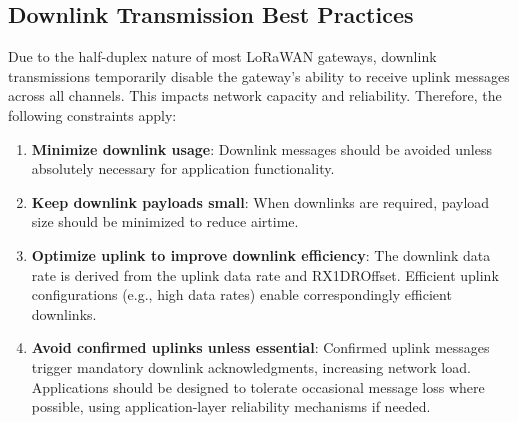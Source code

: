 \subsection{Downlink Transmission Best Practices}

Due to the half-duplex nature of most LoRaWAN gateways, downlink transmissions temporarily disable the gateway’s ability to receive uplink messages across all channels. This impacts network capacity and reliability. Therefore, the following constraints apply:

\begin{enumerate}
    \item \textbf{Minimize downlink usage}: Downlink messages should be avoided unless absolutely necessary for application functionality.
    \item \textbf{Keep downlink payloads small}: When downlinks are required, payload size should be minimized to reduce airtime.
    \item \textbf{Optimize uplink to improve downlink efficiency}: The downlink data rate is derived from the uplink data rate and RX1DROffset. Efficient uplink configurations (e.g., high data rates) enable correspondingly efficient downlinks.
    \item \textbf{Avoid confirmed uplinks unless essential}: Confirmed uplink messages trigger mandatory downlink acknowledgments, increasing network load. Applications should be designed to tolerate occasional message loss where possible, using application-layer reliability mechanisms if needed.
\end{enumerate}




